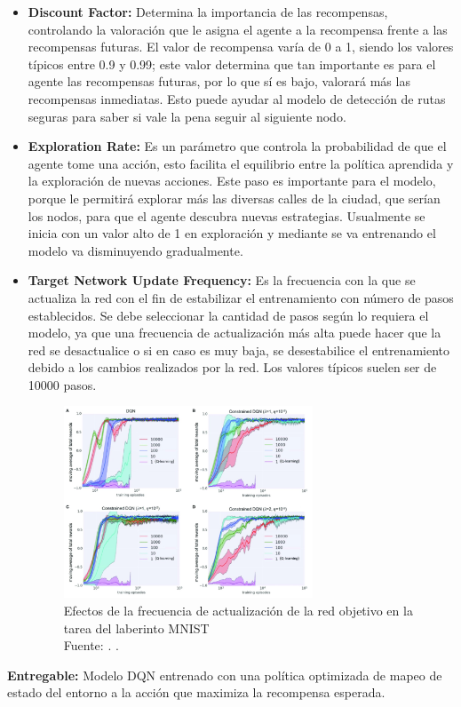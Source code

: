 \begin{itemize}
\begin{itemize}
\begin{itemize}
	\item \textbf{Discount Factor:} Determina la importancia de las recompensas, controlando la valoración que le asigna el agente a la recompensa frente a las recompensas futuras. El valor de recompensa varía de 0 a 1, siendo los valores típicos entre 0.9 y 0.99; este valor determina que tan importante es para el agente las recompensas futuras, por lo que sí es bajo, valorará más las recompensas inmediatas. Esto puede ayudar al modelo de detección de rutas seguras para saber si vale la pena seguir al siguiente nodo.
	\item \textbf{Exploration Rate:} Es un parámetro que controla la probabilidad de que el agente tome una acción, esto facilita el equilibrio entre la política aprendida y la exploración de nuevas acciones. Este paso es importante para el modelo, porque le permitirá explorar más las diversas calles de la ciudad, que serían los nodos, para que el agente descubra nuevas estrategias. Usualmente se inicia con un valor alto de 1 en exploración y mediante se va entrenando el modelo va disminuyendo gradualmente.
	
	\item \textbf{Target Network Update Frequency:} Es la frecuencia con la que se actualiza la red con el fin de estabilizar el entrenamiento con número de pasos establecidos. Se debe seleccionar la cantidad de pasos según lo requiera el modelo, ya que una frecuencia de actualización más alta puede hacer que la red se desactualice o si en caso es muy baja, se desestabilice el entrenamiento debido a los cambios realizados por la red. Los valores típicos suelen ser de 10000 pasos. 
		\medskip
	\begin{figure}[h]
		\begin{center}
			\includegraphics[width=0.7\textwidth]{3/figures/batch.jpg}
			\caption[Efectos de la frecuencia de actualización de la red objetivo en la tarea del laberinto MNIST]{Efectos de la frecuencia de actualización de la red objetivo en la tarea del laberinto MNIST\\
				Fuente: \citep*{gl_constr}. .}
			\label{1:fig}
		\end{center}
	\end{figure}
	\medskip
\end{itemize}
\textbf{Entregable:} Modelo DQN entrenado con una política optimizada de mapeo de estado del entorno a la acción que maximiza la recompensa esperada.


\end{itemize}
\end{itemize}
